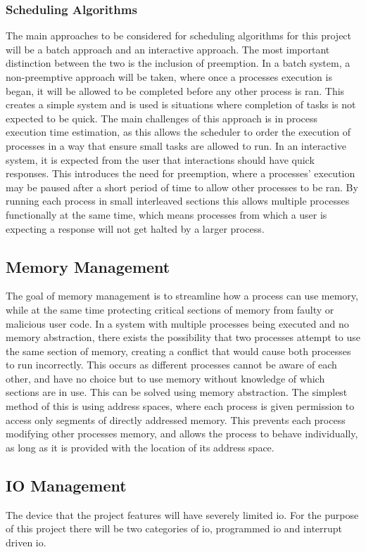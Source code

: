 \subsubsection{Scheduling Algorithms}
The main approaches to be considered for scheduling algorithms for this project will be a batch approach and an interactive approach. The most important distinction between the two is the inclusion of preemption. In a batch system, a non-preemptive approach will be taken, where once a processes execution is began, it will be allowed to be completed before any other process is ran. This creates a simple system and is used is situations where completion of tasks is not expected to be quick. The main challenges of this approach is in process execution time estimation, as this allows the scheduler to order the execution of processes in a way that ensure small tasks are allowed to run. In an interactive system, it is expected from the user that interactions should have quick responses. This introduces the need for preemption, where a processes' execution may be paused after a short period of time to allow other processes to be ran. By running each process in small interleaved sections this allows multiple processes functionally at the same time, which means processes from which a user is expecting a response will not get halted by a larger process\cite{modern_operating}.
\subsection{Memory Management}
The goal of memory management is to streamline how a process can use memory, while at the same time protecting critical sections of memory from faulty or malicious user code. In a system with multiple processes being executed and no memory abstraction, there exists the possibility that two processes attempt to use the same section of memory, creating a conflict that would cause both processes to run incorrectly. This occurs as different processes cannot be aware of each other, and have no choice but to use memory without knowledge of which sections are in use. This can be solved using memory abstraction. The simplest method of this is using address spaces, where each process is given permission to access only segments of directly addressed memory. This prevents each process modifying other processes memory, and allows the process to behave individually, as long as it is provided with the location of its address space\cite{modern_operating}.
\subsection{IO Management}
The device that the project features will have severely limited \ac{io}. For the purpose of this project there will be two categories of \ac{io}, programmed \ac{io} and interrupt driven \ac{io}. 
